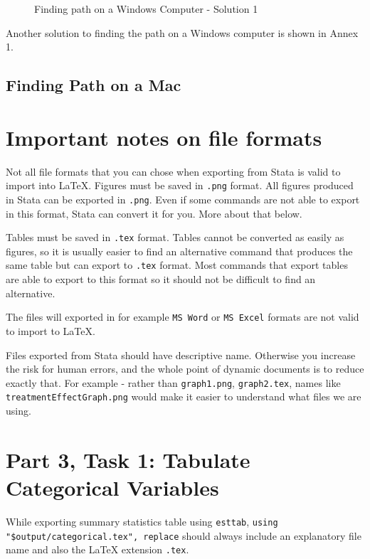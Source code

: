 \documentclass[]{article}
\begin{document}
\begin{figure}[H]
	\centering
	\caption{Finding path on a Windows Computer - Solution 1}
	\label{fig:pathwin3}
\end{figure}


Another solution to finding the path on a Windows computer is shown in Annex 1.
	
\subsection*{Finding Path on a Mac}


\section*{Important notes on file formats}
Not all file formats that you can chose when exporting from Stata is valid to import into {\LaTeX}. Figures must be saved in \texttt{.png} format. All figures produced in Stata can be exported in \texttt{.png}. Even if some commands are not able to export in this format, Stata can convert it for you. More about that below. 

Tables must be saved in \texttt{.tex} format. Tables cannot be converted as easily as figures, so it is usually easier to find an alternative command that produces the same table but can export to \texttt{.tex} format. Most commands that export tables are able to export to this format so it should not be difficult to find an alternative.

The files will exported in for example \texttt{MS Word} or \texttt{MS Excel} formats are not valid to import to {\LaTeX}.

Files exported from Stata should have descriptive name. Otherwise you increase the risk for human errors, and the whole point of dynamic documents is to reduce exactly that. For example - rather than \texttt{graph1.png}, \texttt{graph2.tex}, names like \texttt{treatmentEffectGraph.png} would make it easier to understand what files we are using.

\section*{Part 3, Task 1: Tabulate Categorical Variables}

While exporting summary statistics table using \texttt{esttab}, \verb|using 	"$output/categorical.tex", replace| should always include an explanatory file name and also the {\LaTeX} extension \texttt{.tex}.
\end{document}
